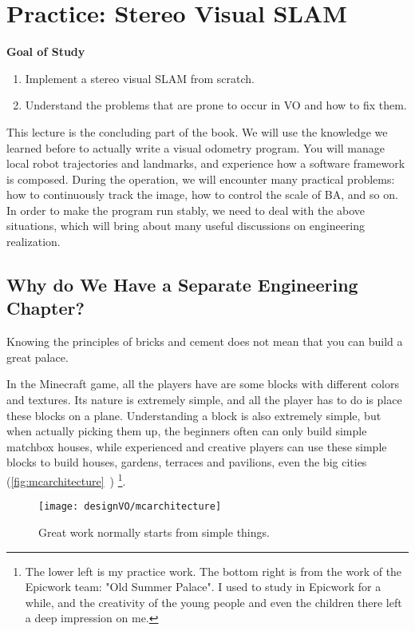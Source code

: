 \chapter{Practice: Stereo Visual SLAM}
\begin{mdframed}  
	\textbf{Goal of Study}
	\begin{enumerate}[labelindent=0em,leftmargin=1.5em]
	\item Implement a stereo visual SLAM from scratch.
	\item Understand the problems that are prone to occur in VO and how to fix them.
	\end{enumerate}
\end{mdframed}

This lecture is the concluding part of the book. We will use the knowledge we learned before to actually write a visual odometry program. You will manage local robot trajectories and landmarks, and experience how a software framework is composed. During the operation, we will encounter many practical problems: how to continuously track the image, how to control the scale of BA, and so on. In order to make the program run stably, we need to deal with the above situations, which will bring about many useful discussions on engineering realization.

\newpage
\section{Why do We Have a Separate Engineering Chapter?}
Knowing the principles of bricks and cement does not mean that you can build a great palace.

In the Minecraft game, all the players have are some blocks with different colors and textures. Its nature is extremely simple, and all the player has to do is place these blocks on a plane. Understanding a block is also extremely simple, but when actually picking them up, the beginners often can only build simple matchbox houses, while experienced and creative players can use these simple blocks to build houses, gardens, terraces and pavilions, even the big cities (\autoref{fig:mcarchitecture}~) \footnote{The lower left is my practice work. The bottom right is from the work of the Epicwork team: "Old Summer Palace". I used to study in Epicwork for a while, and the creativity of the young people and even the children there left a deep impression on me. }.

\begin{figure}[!htp]
	\centering    
	\texttt{[image: designVO/mcarchitecture]}\\
	\caption{Great work normally starts from simple things.}
	\label{fig:mcarchitecture}
\end{figure}

